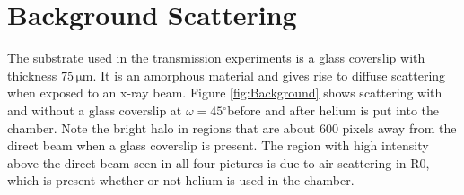 \documentclass[letterpaper,12pt]{article}
\newcommand{\dg}{$^{\circ}$}%
\begin{document}
\section{Background Scattering}
The substrate used in the transmission experiments is a glass coverslip with thickness $75\,\mathrm{\mu m}$. It is an amorphous material and gives rise to diffuse scattering when exposed to an x-ray beam. Figure \ref{fig:Background} shows scattering with and without a glass coverslip at $\omega=45$\dg before and after helium is put into the chamber. Note the bright halo in regions that are about 600 pixels away from the direct beam when a glass coverslip is present. The region with high intensity above the direct beam seen in all four pictures is due to air scattering in R0, which is present whether or not helium is used in the chamber. 
\begin{figure}[htbp]
	\centering
	\qquad
	\qquad

\end{figure}
\end{document}
